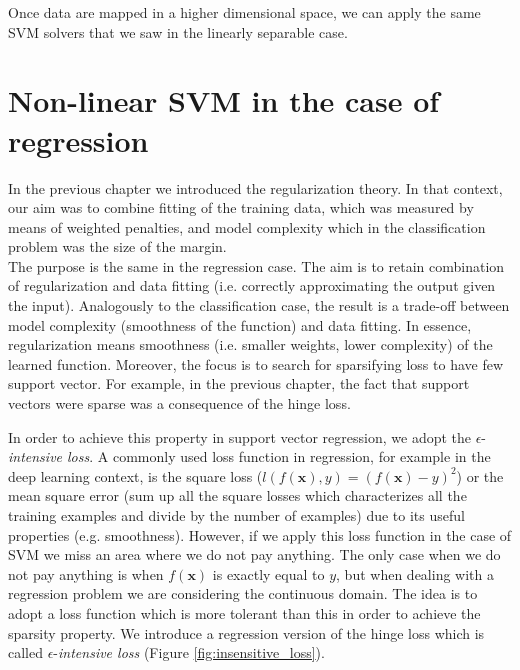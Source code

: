 Once data are mapped in a higher dimensional space, we can apply the same SVM solvers that we saw in the linearly separable case.

\section{Non-linear SVM in the case of regression}
In the previous chapter we introduced the regularization theory. In that context, our aim was to combine fitting of the training data, which was measured by means of weighted penalties, and model complexity which in the classification problem was the size of the margin.\\
The purpose is the same in the regression case. The aim is to retain combination of regularization and data fitting (i.e. correctly approximating the output given the input). Analogously to the classification case, the result is a trade-off between model complexity (smoothness of the function) and data fitting. In essence, regularization means smoothness (i.e. smaller weights, lower complexity) of the learned function. Moreover, the focus is to search for sparsifying loss to have few support vector. For example, in the previous chapter, the fact that support vectors were sparse was a consequence of the hinge loss. \newline

In order to achieve this property in support vector regression, we adopt the $\epsilon$-\textit{intensive loss}. A commonly used loss function in regression, for example in the deep learning context, is the square loss ($l(f(\pmb{x}), y) = (f(\pmb{x})-y)^2$) or the mean square error (sum up all the square losses which characterizes all the training examples and divide by the number of examples) due to its useful properties (e.g. smoothness). However, if we apply this loss function in the case of SVM we miss an area where we do not pay anything. The only case when we do not pay anything is when $f(\pmb{x})$ is exactly equal to $y$, but when dealing with a regression problem we are considering the continuous domain. The idea is to adopt a loss function which is more tolerant than this in order to achieve the sparsity property. We introduce a regression version of the hinge loss which is called $\epsilon$-\textit{intensive loss} (Figure \ref{fig:insensitive_loss}).



